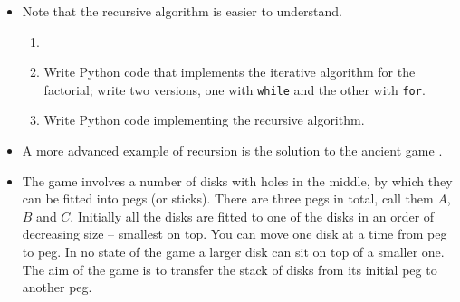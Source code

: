 \documentclass[a4paper]{article}
\begin{document}
{\begin{itemize}
\begin{ucodeframe}
\end{ucodeframe}
\item Note that the recursive algorithm is easier to understand. 

\begin{uexercise}
\begin{enumerate}
\item[]
\item Write Python code that implements the iterative algorithm for
the factorial; write two versions, one with \Verb+while+ and the other with
\Verb+for+.

\begin{hide}
\begin{usolution}
\begin{ucodeframe}
\end{ucodeframe}

\begin{ucodeframe}
\end{ucodeframe}
\end{usolution}
\end{hide}

\item Write Python code implementing the recursive algorithm.
\begin{hide}
\begin{usolution}
\begin{ucodeframe}
\end{ucodeframe}
\end{usolution}
\end{hide}
\end{enumerate}
\end{uexercise}


\item A more advanced example of recursion is the solution to the ancient
game \href{https://en.wikipedia.org/wiki/Tower_of_Hanoi}{}.

\item The game involves a number of disks with holes in the middle, by which
they can be fitted into pegs (or sticks). There are three pegs in total, call
them $A$, $B$ and $C$. Initially all the disks are fitted to one of the disks in
an order of decreasing size -- smallest on top. You can move one disk at a time
from peg to peg. In no state of the game a larger disk can sit on top of a
smaller one. The aim of the game is to transfer the stack of disks from its
initial peg to another peg.


\end{itemize}}
\end{document}
